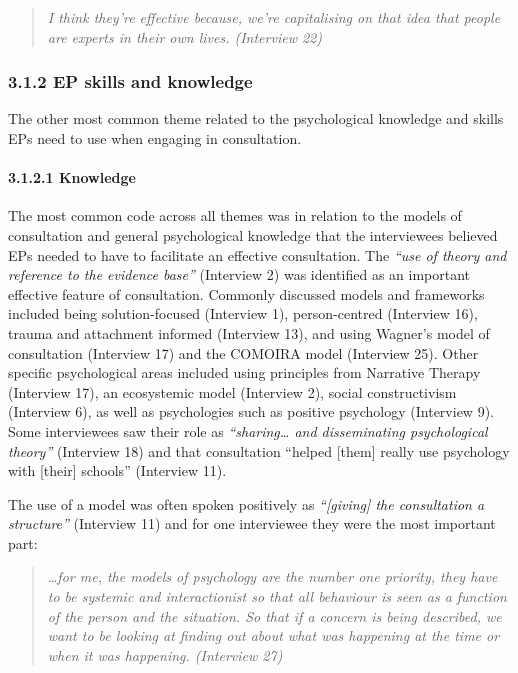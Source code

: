 \documentclass[
  english,
  man]{apa7}
\let\oldparagraph\paragraph
\renewcommand{\paragraph}[1]{\oldparagraph{#1}\mbox{}}
\begin{document}
\begin{quote}
\emph{I think they're effective because, we're capitalising on that idea
that people are experts in their own lives. (Interview 22)}
\end{quote}

\hypertarget{ep-skills-and-knowledge}{%
\subsubsection{3.1.2 EP skills and knowledge}\label{ep-skills-and-knowledge}}

The other most common theme related to the psychological knowledge and skills EPs need to use when engaging in consultation.

\hypertarget{knowledge}{%
\paragraph{3.1.2.1 Knowledge}\label{knowledge}}

The most common code across all themes was in relation to the models of consultation and general psychological knowledge that the interviewees believed EPs needed to have to facilitate an effective consultation. The \emph{``use of theory and reference to the evidence base''} (Interview 2) was identified as an important effective feature of consultation. Commonly discussed models and frameworks included being solution-focused (Interview 1), person-centred (Interview 16), trauma and attachment informed (Interview 13), and using Wagner's model of consultation (Interview 17) and the COMOIRA model (Interview 25). Other specific psychological areas included using principles from Narrative Therapy (Interview 17), an ecosystemic model (Interview 2), social constructivism (Interview 6), as well as psychologies such as positive psychology (Interview 9). Some interviewees saw their role as \emph{``sharing\ldots{} and disseminating psychological theory''} (Interview 18) and that consultation ``helped {[}them{]} really use psychology with {[}their{]} schools'' (Interview 11).

The use of a model was often spoken positively as \emph{``{[}giving{]} the consultation a structure''} (Interview 11) and for one interviewee they were the most important part:

\begin{quote}
\emph{\ldots for me, the models of psychology are the number one priority, they
have to be systemic and interactionist so that all behaviour is seen
as a function of the person and the situation. So that if a concern is
being described, we want to be looking at finding out about what was
happening at the time or when it was happening. (Interview 27)}
\end{quote}
\end{document}
